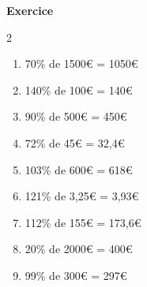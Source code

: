 \documentclass[10pt,a4paper]{article}
\newcounter{nexo}
\begin{document}
\textbf{Exercice \thenexo} 
\begin{multicols}{2}
	\begin{enumerate}[label=\alph*)]
		\item 70\% de 1500€ = 1050€
		\item 140\% de 100€ = 140€
		\item 90\% de 500€ = 450€
		\item 72\% de 45€ = 32,4€
		\item 103\% de 600€ = 618€
		\item 121\% de 3,25€ = 3,93€
		\item 112\% de 155€ = 173,6€
		\item 20\% de 2000€ = 400€
		\item 99\% de 300€ = 297€
	\end{enumerate}
\end{multicols}
\end{document}
